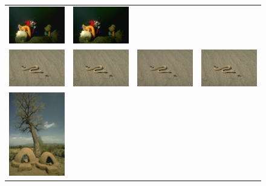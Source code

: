 \documentclass[10pt,twocolumn,letterpaper]{article}
\begin{document}
\begin{figure}[h!]
\begin{tabular}{cccc}
     	\includegraphics[width=1.5in]{images/used/appendix/jpg/BSD100/45096_SRGAN-VGG54} &
     	\includegraphics[width=1.5in]{images/used/appendix/jpg/BSD100/45096_HR} \\     	
     	\includegraphics[width=1.5in]{images/used/appendix/jpg/BSD100/196073_bicubic}&
     	\includegraphics[width=1.5in]{images/used/appendix/jpg/BSD100/196073_SRResNet-MSE} &
     	\includegraphics[width=1.5in]{images/used/appendix/jpg/BSD100/196073_SRGAN-VGG54} &
     	\includegraphics[width=1.5in]{images/used/appendix/jpg/BSD100/196073_HR} \\     	
     	\includegraphics[width=1.5in]{images/used/appendix/jpg/BSD100/54082_bicubic}&

\end{tabular}
\end{figure}
\end{document}
